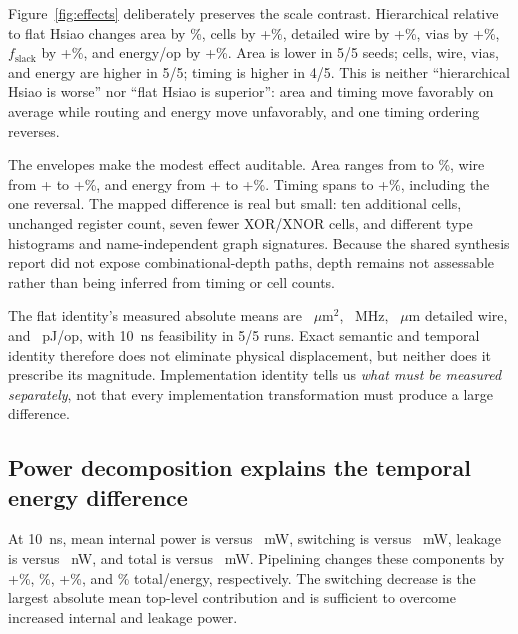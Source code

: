 \documentclass[conference,10pt]{IEEEtran}
\begin{document}
Figure~\ref{fig:effects} deliberately preserves the scale contrast. Hierarchical relative to flat Hsiao changes area by \HsAreaMean\%, cells by +\HsCellsMean\%, detailed wire by +\HsWireMean\%, vias by +\HsViasMean\%, $f_{\mathrm{slack}}$ by +\HsFreqMean\%, and energy/op by +\HsEnergyMean\%. Area is lower in 5/5 seeds; cells, wire, vias, and energy are higher in 5/5; timing is higher in 4/5. This is neither ``hierarchical Hsiao is worse'' nor ``flat Hsiao is superior'': area and timing move favorably on average while routing and energy move unfavorably, and one timing ordering reverses.

The envelopes make the modest effect auditable. Area ranges from \HsAreaMin{} to \HsAreaMax\%, wire from +\HsWireMin{} to +\HsWireMax\%, and energy from +\HsEnergyMin{} to +\HsEnergyMax\%. Timing spans \HsFreqMin{} to +\HsFreqMax\%, including the one reversal. The mapped difference is real but small: ten additional cells, unchanged register count, seven fewer XOR/XNOR cells, and different type histograms and name-independent graph signatures. Because the shared synthesis report did not expose combinational-depth paths, depth remains not assessable rather than being inferred from timing or cell counts.

The flat identity's measured absolute means are \HsiaoAreaAbs~$\mu$m$^2$, \HsiaoFreqAbs~MHz, \HsiaoWireAbs~$\mu$m detailed wire, and \HsiaoEnergyAbs~pJ/op, with 10~ns feasibility in 5/5 runs. Exact semantic and temporal identity therefore does not eliminate physical displacement, but neither does it prescribe its magnitude. Implementation identity tells us \emph{what must be measured separately}, not that every implementation transformation must produce a large difference.



\subsection{Power decomposition explains the temporal energy difference}

At 10~ns, mean internal power is \CombInternalMw{} versus \PipeInternalMw~mW, switching is \CombSwitchingMw{} versus \PipeSwitchingMw~mW, leakage is \CombLeakageNw{} versus \PipeLeakageNw~nW, and total is \CombTotalMw{} versus \PipeTotalMw~mW. Pipelining changes these components by +\PowerInternalEffect\%, \PowerSwitchingEffect\%, +\PowerLeakageEffect\%, and \SecEnergyMean\% total/energy, respectively. The switching decrease is the largest absolute mean top-level contribution and is sufficient to overcome increased internal and leakage power.
\end{document}
